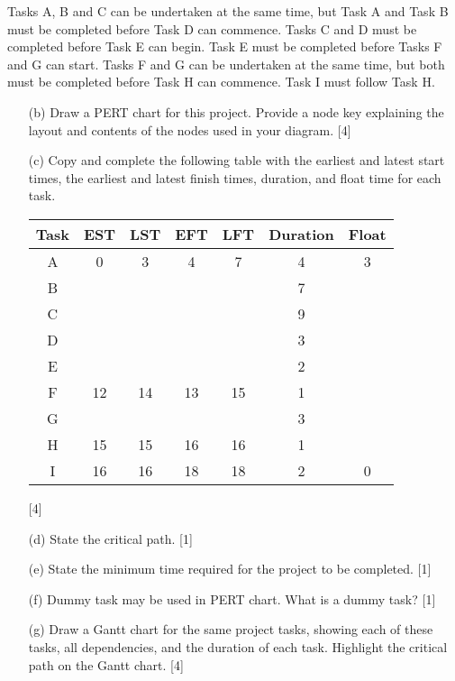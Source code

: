 Tasks A, B and C can be undertaken at the same time, but Task A and
Task B must be completed before Task D can commence. Tasks C and D
must be completed before Task E can begin. Task E must be completed
before Tasks F and G can start. Tasks F and G can be undertaken at
the same time, but both must be completed before Task H can commence.
Task I must follow Task H. 
\begin{enumerate}
\item[(b)]  Draw a PERT chart for this project. Provide a node key explaining
the layout and contents of the nodes used in your diagram. \hfill{}{[}4{]} 
\item[(c)]  Copy and complete the following table with the earliest and latest
start times, the earliest and latest finish times, duration, and float
time for each task. 
\noindent \begin{center}
\begin{tabular}{|c|c|c|c|c|c|c|}
\hline 
Task & EST & LST & EFT & LFT & Duration & Float\tabularnewline
\hline 
A & 0 & 3 & 4 & 7 & 4 & 3\tabularnewline
\hline 
B &  &  &  &  & 7 & \tabularnewline
\hline 
C &  &  &  &  & 9 & \tabularnewline
\hline 
D &  &  &  &  & 3 & \tabularnewline
\hline 
E &  &  &  &  & 2 & \tabularnewline
\hline 
F & 12 & 14 & 13 & 15 & 1 & \tabularnewline
\hline 
G &  &  &  &  & 3 & \tabularnewline
\hline 
H & 15 & 15 & 16 & 16 & 1 & \tabularnewline
\hline 
I & 16 & 16 & 18 & 18 & 2 & 0\tabularnewline
\hline 
\end{tabular} 
\par\end{center}

\hfill{}{[}4{]}
\item[(d)]  State the critical path.\hfill{} {[}1{]}
\item[(e)]  State the minimum time required for the project to be completed.
\hfill{} {[}1{]}
\item[(f)]  Dummy task may be used in PERT chart. What is a dummy task? \hfill{}
{[}1{]}
\item[(g)]  Draw a Gantt chart for the same project tasks, showing each of these
tasks, all dependencies, and the duration of each task. Highlight
the critical path on the Gantt chart.\hfill{} {[}4{]}
\end{enumerate}